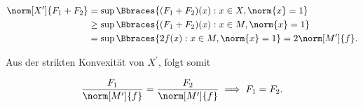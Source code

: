 \begin{solution}
\begin{enumerate}[label = Fall \arabic*:]
  \begin{align*}
    \norm[X^\prime]{F_1 + F_2}
    & =
    \sup \Bbraces{(F_1 + F_2)(x): x \in X, \norm{x} = 1} \\
    & \geq
    \sup \Bbraces{(F_1 + F_2)(x): x \in M, \norm{x} = 1} \\
    & =
    \sup \Bbraces{2 f(x): x \in M, \norm{x} = 1}
    =
    2 \norm[M^\prime]{f}.
  \end{align*}

  Aus der strikten Konvexität von $X^\prime$, folgt somit

  \begin{align*}
    \frac{F_1}{\norm[M^\prime]{f}}
    =
    \frac{F_2}{\norm[M^\prime]{f}}
    \implies
    F_1 = F_2.
  \end{align*}

\end{enumerate}

\end{solution}
